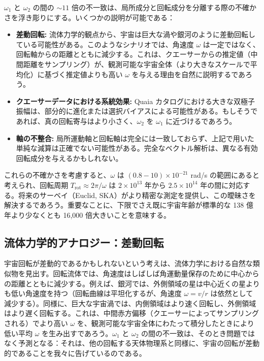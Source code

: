 \documentclass[11pt,a4paper]{article}
\begin{document}
	\(\omega_1\) と \(\omega_2\) の間の \(\sim11\) 倍の不一致は、局所成分と回転成分を分離する際の不確かさを浮き彫りにする。いくつかの説明が可能である：
	\begin{itemize}
		\item \textbf{差動回転:} 流体力学的観点から、宇宙は巨大な渦や銀河のように差動回転している可能性がある。このようなシナリオでは、角速度 \(\omega\) は一定ではなく、回転軸からの距離とともに減少する。これは、クエーサーからの推定値（中間距離をサンプリング）が、観測可能な宇宙全体（より大きなスケールで平均化）に基づく推定値よりも高い \(\omega\) を与える理由を自然に説明するであろう。
		\item \textbf{クエーサーデータにおける系統効果:} Quaia カタログにおける大きな双極子振幅は、部分的に進化または選択バイアスによる可能性がある。もしそうであれば、真の回転寄与はより小さく、\(\omega_2\) を \(\omega_1\) に近づけるであろう。
		\item \textbf{軸の不整合:} 局所運動軸と回転軸は完全には一致しておらず、上記で用いた単純な減算は正確でない可能性がある。完全なベクトル解析は、異なる有効回転成分を与えるかもしれない。
	\end{itemize}
	これらの不確かさを考慮すると、\(\omega\) は \((0.8-10)\times10^{-21}\) rad/s の範囲にあると考えられ、回転周期 \(T_{\text{rot}} \approx 2\pi/\omega\) は \(2\times10^{13}\) 年から \(2.5\times10^{14}\) 年の間に対応する。将来のサーベイ（Euclid, SKA）がより精密な測定を提供し、この曖昧さを解決するであろう。重要なことに、下限でさえ既に宇宙年齢が標準的な 138 億年より少なくとも 16,000 倍大きいことを意味する。
	
	\subsection{流体力学的アナロジー：差動回転}
	
	宇宙回転が差動的であるかもしれないという考えは、流体力学における自然な類似物を見出す。回転流体では、角速度はしばしば角運動量保存のために中心からの距離とともに減少する。例えば、銀河では、外側領域の星は中心近くの星よりも低い角速度を持つ（回転曲線は平坦化するが、角速度 \(\omega = v/r\) は依然として減少する）。同様に、巨大な宇宙渦では、内側領域はより速く回転し、外側領域はより遅く回転する。これは、中間赤方偏移（クエーサーによってサンプリングされる）でより高い \(\omega\) を、観測可能な宇宙全体にわたって積分したときにより低い平均 \(\omega\) を生み出すであろう。\(\omega_1\) と \(\omega_2\) の間の不一致は、そのとき問題ではなく予測となる：それは、他の回転する天体物理系と同様に、宇宙の回転が差動的であることを我々に告げているのである。
	
\end{document}

